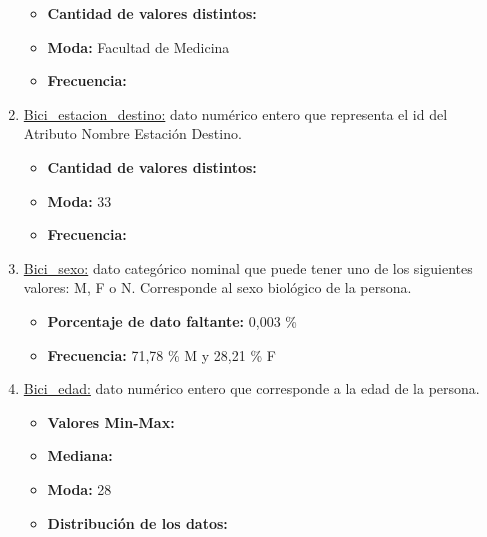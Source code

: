 \begin{enumerate}
\begin{itemize}
            \item \textbf{Cantidad de valores distintos:} 
            \item \textbf{Moda:} Facultad de Medicina 
            \item \textbf{Frecuencia:}
        \end{itemize}
    \item \underline{Bici_estacion_destino:} dato numérico entero que representa el id del Atributo Nombre Estación Destino.
        \begin{itemize}
            \item \textbf{Cantidad de valores distintos:} 
            \item \textbf{Moda:} 33
            \item \textbf{Frecuencia:}
        \end{itemize}
    \item \underline{Bici_sexo:} dato categórico nominal que puede tener uno de los siguientes valores: M, F o N. Corresponde al sexo biológico de la persona. 
       \begin{itemize}
            \item \textbf{Porcentaje de dato faltante:} 0,003 \%
            \item \textbf{Frecuencia:} 71,78 \% M y 28,21 \% F
        \end{itemize}    
    \item \underline{Bici_edad:} dato numérico entero que corresponde a la edad de la persona.
        \begin{itemize}
            \item \textbf{Valores Min-Max:} 
            \item \textbf{Mediana:}
            \item \textbf{Moda:} 28
            \item \textbf{Distribución de los datos:}
        \end{itemize}    
\end{enumerate}

